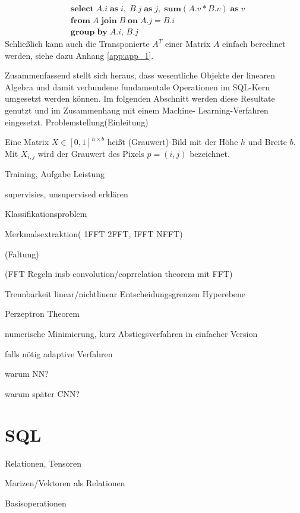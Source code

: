 \begin{align*}
    & \mathbf{select} \; A.i \; \mathbf{as} \; i, \; B.j \; \mathbf{as} \; j, \; \mathbf{sum} (A.v*B.v) \; \mathbf{as} \; v\\
    & \mathbf{from} \; A \; \mathbf{join} \; B \; \mathbf{on} \; A.j=B.i \; \\
    & \mathbf{group} \; \mathbf{by} \; A.i, \, B.j
\end{align*}
Schließlich kann auch die Transponierte $A^T$ einer Matrix $A$ einfach berechnet werden, siehe dazu Anhang \ref{app:app_1}.

Zusammenfassend stellt sich heraus, dass wesentliche Objekte der linearen Algebra und damit verbundene fundamentale Operationen im SQL-Kern umgesetzt werden können.  
Im folgenden Abschnitt werden diese Resultate genutzt und im Zusammenhang mit einem Machine- Learning-Verfahren eingesetzt.
Problemstellung(Einleitung)

\begin{defi}
    \label{def:image}
    Eine Matrix $X \in [0,1]^{h \times b}$ heißt (Grauwert)-Bild mit der Höhe $h$ und Breite $b$. Mit $X_{i,j}$ wird der Grauwert des Pixels $p=(i,j)$ bezeichnet.
\end{defi}


Training, Aufgabe Leistung

supervisies, unsupervised erklären

Klassifikationsproblem

Merkmalsextraktion( 1FFT 2FFT, IFFT NFFT)

(Faltung)

(FFT Regeln insb convolution/coprrelation theorem mit FFT)

Trennbarkeit linear/nichtlinear Entscheidungsgrenzen Hyperebene

Perzeptron Theorem

numerische Minimierung, kurz Abstiegsverfahren in einfacher Version

falls nötig adaptive Verfahren

warum NN?

warum später CNN?


\section*{SQL}
Relationen, Tensoren

Marizen/Vektoren als Relationen

Basisoperationen

